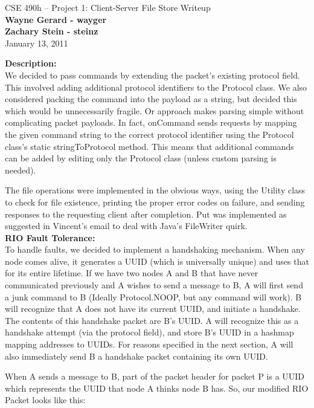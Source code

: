\documentclass[11pt]{article}
\begin{document}
\begin{center}
{\large CSE 490h -- Project 1: Client-Server File Store Writeup} \\
\textbf{Wayne Gerard - wayger} \\
\textbf{Zachary Stein - steinz} \\
January 13, 2011
\end{center}

\textbf{Description:} \\

We decided to pass commands by extending the packet's existing protocol field. This involved adding additional protocol identifiers to the Protocol class. We also considered packing the command into the payload as a string, but decided this  which would be unnecessarily fragile. Or approach makes parsing simple without complicating packet payloads. In fact, onCommand sends requests by mapping the given command string to the correct protocol identifier using the Protocol class's static stringToProtocol method. This means that additional commands can be added by editing only the Protocol class (unless custom parsing is needed).

The file operations were implemented in the obvious ways, using the Utility class to check for file existence, printing the proper error codes on failure, and sending responses to the requesting client after completion. Put was implemented as suggested in Vincent's email to deal with Java's FileWriter quirk. \\

\textbf{RIO Fault Tolerance:} \\

To handle faults, we decided to implement a handshaking mechanism. When any node comes alive, it generates a UUID (which is universally unique) and uses that for its entire lifetime. If we have two nodes A and B that have never communicated previously and A wishes to send a message to B, A will first send a junk command to B (Ideally Protocol.NOOP, but any command will work). B will recognize that A does not have its current UUID, and initiate a handshake. The contents of this handshake packet are B's UUID. A will recognize this as a handshake attempt (via the protocol field), and store B's UUID in a hashmap mapping addresses to UUIDs. For reasons specified in the next section, A will also immediately send B a handshake packet containing its own UUID.

When A sends a message to B, part of the packet header for packet P is a UUID which represents the UUID that node A thinks node B has. So, our modified RIO Packet looks like this:
\end{document}
